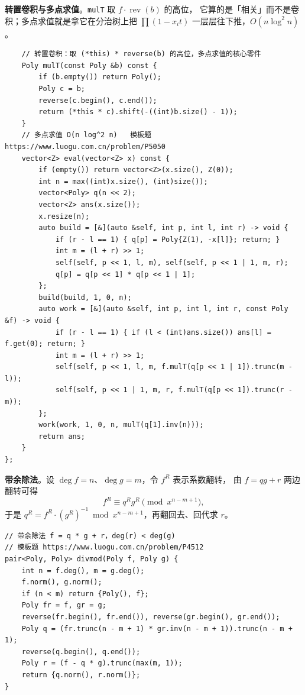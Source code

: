 		\textbf{转置卷积与多点求值}。\texttt{mulT} 取 $f \cdot \operatorname{rev}(b)$ 的高位，
		它算的是「相关」而不是卷积；多点求值就是拿它在分治树上把
		$\prod (1 - x_i t)$ 一层层往下推，$O(n \log^2 n)$。

		\begin{verbatim}
    // 转置卷积：取 (*this) * reverse(b) 的高位，多点求值的核心零件
    Poly mulT(const Poly &b) const {
        if (b.empty()) return Poly();
        Poly c = b;
        reverse(c.begin(), c.end());
        return (*this * c).shift(-((int)b.size() - 1));
    }
    // 多点求值 O(n log^2 n)   模板题 https://www.luogu.com.cn/problem/P5050
    vector<Z> eval(vector<Z> x) const {
        if (empty()) return vector<Z>(x.size(), Z(0));
        int n = max((int)x.size(), (int)size());
        vector<Poly> q(n << 2);
        vector<Z> ans(x.size());
        x.resize(n);
        auto build = [&](auto &self, int p, int l, int r) -> void {
            if (r - l == 1) { q[p] = Poly{Z(1), -x[l]}; return; }
            int m = (l + r) >> 1;
            self(self, p << 1, l, m), self(self, p << 1 | 1, m, r);
            q[p] = q[p << 1] * q[p << 1 | 1];
        };
        build(build, 1, 0, n);
        auto work = [&](auto &self, int p, int l, int r, const Poly &f) -> void {
            if (r - l == 1) { if (l < (int)ans.size()) ans[l] = f.get(0); return; }
            int m = (l + r) >> 1;
            self(self, p << 1, l, m, f.mulT(q[p << 1 | 1]).trunc(m - l));
            self(self, p << 1 | 1, m, r, f.mulT(q[p << 1]).trunc(r - m));
        };
        work(work, 1, 0, n, mulT(q[1].inv(n)));
        return ans;
    }
};
		\end{verbatim}

		\textbf{带余除法}。设 $\deg f = n$、$\deg g = m$，令 $f^R$ 表示系数翻转，
		由 $f = qg + r$ 两边翻转可得
		$$f^R \equiv q^R g^R \pmod{x^{n-m+1}},$$
		于是 $q^R = f^R \cdot (g^R)^{-1} \bmod x^{n-m+1}$，再翻回去、回代求 $r$。

		\begin{verbatim}
// 带余除法 f = q * g + r，deg(r) < deg(g)
// 模板题 https://www.luogu.com.cn/problem/P4512
pair<Poly, Poly> divmod(Poly f, Poly g) {
    int n = f.deg(), m = g.deg();
    f.norm(), g.norm();
    if (n < m) return {Poly(), f};
    Poly fr = f, gr = g;
    reverse(fr.begin(), fr.end()), reverse(gr.begin(), gr.end());
    Poly q = (fr.trunc(n - m + 1) * gr.inv(n - m + 1)).trunc(n - m + 1);
    reverse(q.begin(), q.end());
    Poly r = (f - q * g).trunc(max(m, 1));
    return {q.norm(), r.norm()};
}
		\end{verbatim}


